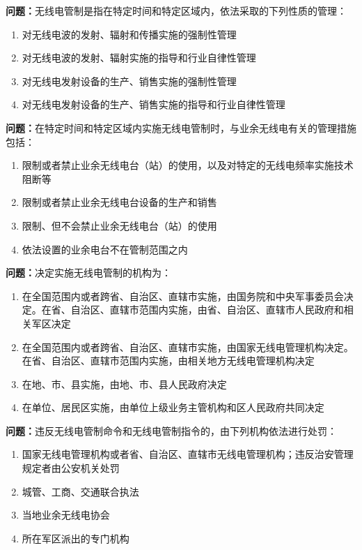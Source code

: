 \documentclass{ctexbook}%
\begin{document}
\textbf{问题：}无线电管制是指在特定时间和特定区域内，依法采取的下列性质的管理：
\begin{enumerate}[label=\Alph*), leftmargin=3em]
\item 对无线电波的发射、辐射和传播实施的强制性管理
\item 对无线电波的发射、辐射实施的指导和行业自律性管理
\item 对无线电发射设备的生产、销售实施的强制性管理
\item 对无线电发射设备的生产、销售实施的指导和行业自律性管理
\end{enumerate}

\textbf{问题：}在特定时间和特定区域内实施无线电管制时，与业余无线电有关的管理措施包括：
\begin{enumerate}[label=\Alph*), leftmargin=3em]
\item 限制或者禁止业余无线电台（站）的使用，以及对特定的无线电频率实施技术阻断等
\item 限制或者禁止业余无线电台设备的生产和销售
\item 限制、但不会禁止业余无线电台（站）的使用
\item 依法设置的业余电台不在管制范围之内
\end{enumerate}

\textbf{问题：}决定实施无线电管制的机构为：
\begin{enumerate}[label=\Alph*), leftmargin=3em]
\item 在全国范围内或者跨省、自治区、直辖市实施，由国务院和中央军事委员会决定。在省、自治区、直辖市范围内实施，由省、自治区、直辖市人民政府和相关军区决定
\item 在全国范围内或者跨省、自治区、直辖市实施，由国家无线电管理机构决定。在省、自治区、直辖市范围内实施，由相关地方无线电管理机构决定
\item 在地、市、县实施，由地、市、县人民政府决定
\item 在单位、居民区实施，由单位上级业务主管机构和区人民政府共同决定
\end{enumerate}

\textbf{问题：}违反无线电管制命令和无线电管制指令的，由下列机构依法进行处罚：
\begin{enumerate}[label=\Alph*), leftmargin=3em]
\item 国家无线电管理机构或者省、自治区、直辖市无线电管理机构；违反治安管理规定者由公安机关处罚
\item 城管、工商、交通联合执法
\item 当地业余无线电协会
\item 所在军区派出的专门机构
\end{enumerate}
\end{document}
